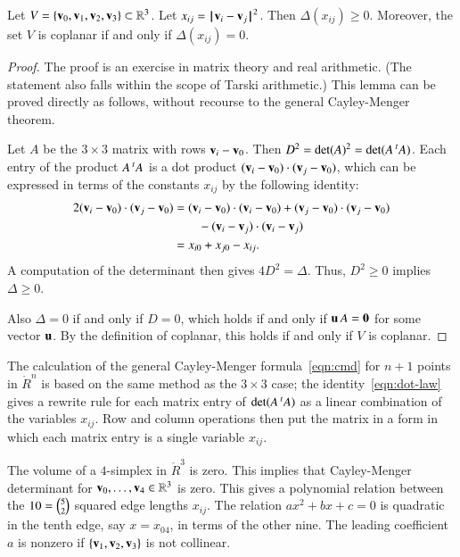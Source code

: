 \begin{lemma}[]\label{lemma:delta-pos}
  Let $V=\{{\mathbf v}_0,{\mathbf v}_1,{\mathbf v}_2,{\mathbf v}_3\}\subset\mathbb{R}^3$.  Let $x_{ij} =
  \norm{\v_i}{\v_j}^2$.  Then $\Delta(x_{ij})\ge 0$.  Moreover, the
  set $V$ is coplanar if and only if $\Delta(x_{ij}) = 0$.%
\end{lemma}

\begin{proof} The proof is an exercise in
  matrix theory and
  real arithmetic.  (The statement also
  falls within the scope of Tarski
  arithmetic.)  This lemma can be proved directly as follows, without
  recourse to the general Cayley-Menger theorem.

  Let $A$ be the $3\times 3$ matrix with rows  ${\mathbf v}_i - {\mathbf v}_0$.  Then
  $D^2 = \det(A)^2 = \det(A \,\hbox{}^t A)$.  Each entry of the
  product $A\,\hbox{}^tA$ is a dot product $({\mathbf v}_i-{\mathbf v}_0)\cdot
  ({\mathbf v}_j-{\mathbf v}_0)$, which can be expressed in terms of the constants
  $x_{ij}$ by the following identity:
\begin{align}\label{eqn:dot-law}
  2 ({\mathbf v}_i-{\mathbf v}_0)\cdot ({\mathbf v}_j-{\mathbf v}_0) 
&= ({\mathbf v}_i-{\mathbf v}_0)\cdot({\mathbf v}_i-{\mathbf v}_0) + ({\mathbf v}_j-{\mathbf v}_0)\cdot ({\mathbf v}_j-{\mathbf v}_0)\nonumber \\
  & \qquad - ({\mathbf v}_i-{\mathbf v}_j)\cdot ({\mathbf v}_i-{\mathbf v}_j)\nonumber\\
&= x_{i0} + x_{j0} - x_{ij}.
\end{align}
A computation of the determinant then gives $4D^2=\Delta$.
Thus, $D^2\ge0$ implies $\Delta\ge 0$.

Also $\Delta=0$ if and only if $D=0$, which holds if and only if ${\mathbf u}\,
A = {\mathbf 0}$ for some vector ${\mathbf u}$.  By the
definition of coplanar, this holds if and only
if $V$ is coplanar.
\end{proof}

The calculation of the general Cayley-Menger formula~\eqref{eqn:cmd} for
$n+1$ points in $\ring{R}^n$ is based on the same method as the $3\times 3$ case; the identity~\eqref{eqn:dot-law} gives a rewrite rule for each
matrix entry of $\det(A\,\hbox{}^t A)$ as a linear combination of the
variables $x_{ij}$.  Row and column operations then put the matrix in
a form in which each matrix entry is a single variable $x_{ij}$.

\begin{remark}[]\label{rem:CM5}
  The volume of a $4$-simplex in $\ring{R}^3$ is zero.  This implies
  that Cayley-Menger determinant for ${\mathbf v}_0,\ldots,{\mathbf v}_4\in\mathbb{R}^3$
  is zero.  %
  This gives a polynomial relation between the $10 = \tbinom{5}{2}$
  squared edge lengths $x_{ij}$.  The relation $a x^2 + b x + c=0$ is
  quadratic in the tenth edge, say $x=x_{04}$, in terms of the other
  nine. The leading coefficient $a$ is nonzero if $\{{\mathbf v}_1,{\mathbf v}_2,{\mathbf v}_3\}$
  is not collinear.%
\end{remark}

